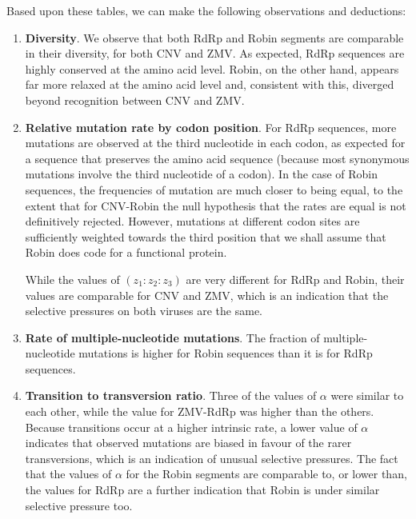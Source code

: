 \documentclass[unnumsec,webpdf,contemporary,large,namedate]{oup-authoring-template}%
\theoremstyle{thmstyleone}%
\theoremstyle{thmstyletwo}%
\theoremstyle{thmstylethree}%
\begin{document}
Based upon these tables, we can make the following observations and deductions:

\begin{enumerate}

\item{\bf Diversity}. We observe that both RdRp and Robin
segments are comparable in their diversity, for both CNV and ZMV.
As expected, RdRp sequences are highly conserved at the amino acid level.
Robin, on the other hand, appears far more relaxed at the amino acid level and, consistent with this, diverged beyond recognition between CNV and ZMV.

\item{\bf Relative mutation rate by codon position}. For RdRp sequences, more mutations are observed
at the third nucleotide in each codon, as expected for a sequence that preserves the amino acid sequence
(because most synonymous mutations involve the third nucleotide of a codon). In the case of Robin sequences,
the frequencies of mutation are much closer to being equal, to the extent that for CNV-Robin the null hypothesis
that the rates are equal is not definitively rejected. However, mutations at different
codon sites are sufficiently weighted towards the third position that we shall assume that Robin
does code for a functional protein.

While the values of $(z_1:z_2:z_3)$ are very different for RdRp and Robin, their values are
comparable for CNV and ZMV, which is an indication that the selective pressures on both
viruses are the same.

\item{\bf Rate of multiple-nucleotide mutations}. The fraction of multiple-nucleotide mutations is
higher for Robin sequences than it is for RdRp sequences.   

\item{\bf Transition to transversion ratio}. Three of the values of $\alpha$ were similar to each other, while the value
for ZMV-RdRp was higher than the others. Because transitions occur at a higher intrinsic rate, a lower
value of $\alpha$ indicates that observed mutations are biased in favour of the rarer transversions,
which is an indication of unusual selective pressures. The fact that the values of $\alpha$ for the Robin segments are
comparable to, or lower than, the values for RdRp are a further indication that Robin
is under similar selective pressure too.


\end{enumerate}
\end{document}
